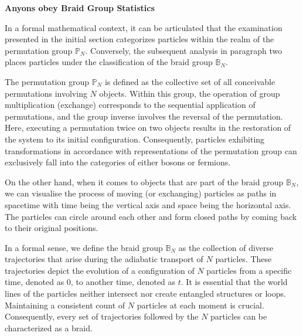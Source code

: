 \documentclass[12pt]{report}
\begin{document}
	\begin{minipage}{1 \textwidth}
		
		\textbf{Anyons obey Braid Group Statistics}\newline
		
		In a formal mathematical context, it can be articulated that the examination presented in the initial section categorizes particles within the realm of the permutation group $\mathbb{P}_N$. Conversely, the subsequent analysis in paragraph two places particles under the classification of the braid group $\mathbb{B}_N$. \newline
		
		The permutation group $\mathbb{P}_N$ is defined as the collective set of all conceivable permutations involving $N$ objects. Within this group, the operation of group multiplication (exchange) corresponds to the sequential application of permutations, and the group inverse involves the reversal of the permutation.
		Here, executing a permutation twice on two objects results in the restoration of the system to its initial configuration. Consequently, particles exhibiting transformations in accordance with representations of the permutation group can exclusively fall into the categories of either bosons or fermions. \newline
		
		On the other hand, when it comes to objects that are part of the braid group $\mathbb{B}_N$, we can visualise the process of moving (or exchanging) particles as paths in spacetime with time being the vertical axis and space being the horizontal axis. The particles can circle around each other and form closed paths by coming back to their original positions. \newline
		
		In a formal sense, we define the braid group $\mathbb{B}_N$ as the collection of diverse trajectories that arise during the adiabatic transport of $N$ particles. These trajectories depict the evolution of a configuration of $N$ particles from a specific time, denoted as 0, to another time, denoted as $t$. It is essential that the world lines of the particles neither intersect nor create entangled structures or loops. Maintaining a consistent count of $N$ particles at each moment is crucial. Consequently, every set of trajectories followed by the $N$ particles can be characterized as a braid. \newline
		
		
		
		
	\end{minipage}
	
\end{document}
